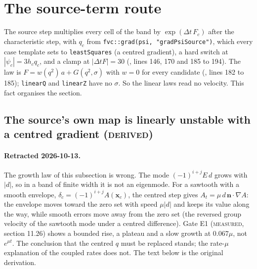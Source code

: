 \documentclass[11pt,a4paper]{article}
\newcommand{\Meas}{\textsc{measured}}
\newcommand{\Der}{\textsc{derived}}
\newcommand{\bn}{\mathbf{n}}
\newcommand{\bx}{\mathbf{x}}
\begin{document}
\section{The source-term route}
\label{sec:source}

The source step multiplies every cell of the band by $\exp(\Delta t\,F_c)$ after the
characteristic step, with $q_c$ from \texttt{fvc::grad(psi, "gradPsiSource")}, which every case
template sets to \texttt{leastSquares} (a centred gradient), a hard switch at
$|\psi_c|=3h_cq_c$, and a clamp at $|\Delta tF|=30$
(, lines 146, 170 and
185 to 194). The law is $F=w(q^2)\,a+G(q^2,\sigma)$ with $w=0$ for every candidate
(, lines 182 to 185); \texttt{linearQ} and \texttt{linearZ} have no
$\sigma$. So the linear laws read no velocity. This fact organises the section.

\subsection{The source's own map is linearly unstable with a centred gradient (\Der)}
\label{sec:eigenmode}

\paragraph{Retracted 2026-10-13.} The growth law of this subsection is wrong. The mode
$(-1)^{i+j}E\,d$ grows with $|d|$, so in a band of finite width it is not an eigenmode. For a
sawtooth with a smooth envelope, $\delta_c=(-1)^{i+j}A(\bx_c)$, the centred step gives
$A_t=\mu\,d\,\bn\cdot\nabla A$: the envelope moves toward the zero set with speed $\mu|d|$ and
keeps its value along the way, while smooth errors move away from the zero set (the reversed
group velocity of the sawtooth mode under a centred difference). Gate E1 (\Meas,
 section 11.26) shows a bounded rise, a plateau and a slow growth at $0.067\mu$,
not $e^{\mu t}$. The conclusion that the centred $q$ must be replaced stands; the rate-$\mu$
explanation of the coupled rates does not. The text below is the original derivation.
\end{document}

